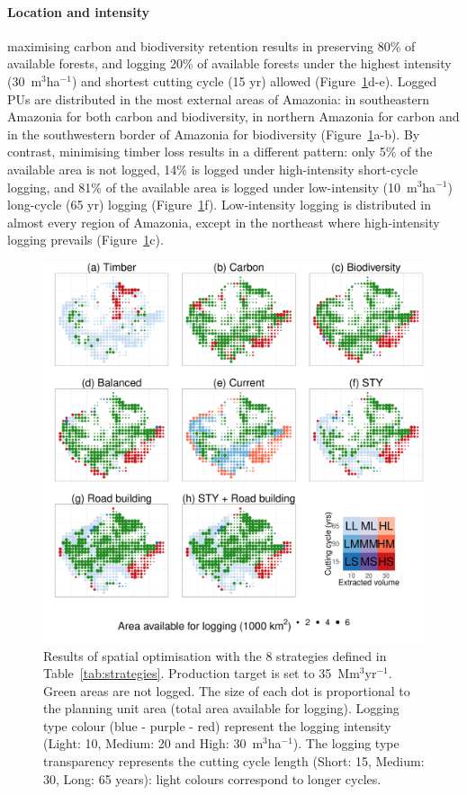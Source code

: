 \documentclass{article}
\begin{document}
\paragraph{Location and intensity}

maximising carbon and biodiversity retention results in preserving 80\% of available forests, and logging 20\% of available forests under the highest intensity (30~m$^3$ha$^{-1}$) and shortest cutting cycle (15 yr) allowed (Figure~\ref{fig:uniqueCost}d-e). Logged PUs are distributed in the most external areas of Amazonia: in southeastern Amazonia for both carbon and biodiversity, in northern Amazonia for carbon and in the southwestern border of Amazonia for biodiversity (Figure~\ref{fig:uniqueCost}a-b). By contrast, minimising timber loss results in a different pattern: only 5\% of the available area is not logged, 14\% is logged under high-intensity short-cycle logging, and 81\% of the available area is logged under low-intensity (10~m$^3$ha$^{-1}$) long-cycle (65 yr) logging (Figure~\ref{fig:uniqueCost}f). Low-intensity logging is distributed in almost every region of Amazonia, except in the northeast where high-intensity logging prevails (Figure~\ref{fig:uniqueCost}c). 

\begin{figure}
    \centering
    \includegraphics[width=\linewidth]{graphs/mapsScenarios.pdf}
    \caption{Results of spatial optimisation with the 8 strategies defined in Table~\ref{tab:strategies}. Production target is set to 35~Mm$^3$yr$^{-1}$. Green areas are not logged. The size of each dot is proportional to the planning unit area (total area available for logging). Logging type colour (blue - purple - red) represent the logging intensity (Light: 10, Medium: 20 and High: 30~m$^3$ha$^{-1}$). The logging type transparency represents the cutting cycle length (Short: 15, Medium: 30, Long: 65 years): light colours correspond to longer cycles.}
    \label{fig:uniqueCost}
    
\end{figure}
\end{document}
